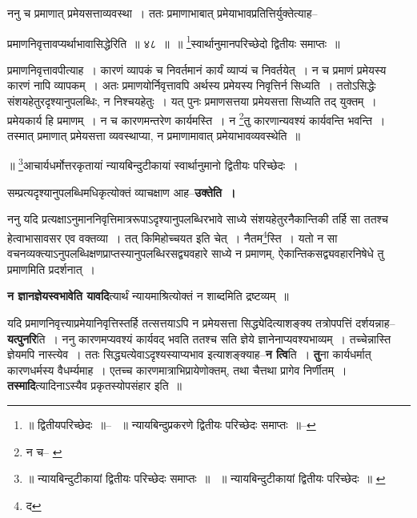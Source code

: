 \documentclass[article,12pt,a4paper]{memoir}
\begin{document}
	  \pstart ननु च प्रमाणात् प्रमेयसत्ताव्यवस्था । ततः प्रमाणाभाबात् प्रमेयाभावप्रतित्तिर्युक्तेत्याह--
	\pend
       
	  \bigskip
	  \begingroup
	

	  \pstart प्रमाणनिवृत्तावप्यर्थाभावासिद्धेरिति ॥ ४८ ॥ ॥ \footnote{॥ द्वितीयपरिच्छेदः ॥--\cite{dp-msD} \cite{dp-msB} ॥ न्यायबिन्दुप्रकरणे द्वितीयः परिच्छेदः समाप्तः ॥--\cite{dp-edE}}\-स्वार्थानुमानपरिच्छेदो द्वितीयः समाप्तः ॥
	\pend
      
	  \endgroup
	 

	  \pstart प्रमाणनिवृत्तावपीत्याह । कारणं व्यापकं च निवर्तमानं कार्यं व्याप्यं च निवर्तयेत् । न च प्रमाणं प्रमेयस्य कारणं नापि व्यापकम् । अतः प्रमाणयोर्निवृत्तावपि अर्थस्य प्रमेयस्य निवृत्तिर्न सिध्यति । ततोऽसिद्धेः संशयहेतुरदृश्यानुपलब्धिः, न निश्चयहेतुः । यत् पुनः प्रमाणसत्तया प्रमेयसत्ता सिध्यति तद् युक्तम् । प्रमेयकार्य हि प्रमाणम् । न च कारणमन्तरेण कार्यमस्ति । न \footnote{न च--\cite{dp-msB} \cite{dp-msD}}\-तु कारणान्यवश्यं कार्यवन्ति भवन्ति । तस्मात् प्रमाणात् प्रमेयसत्ता व्यवस्थाप्या, न प्रमाणामावात् प्रमेयाभावव्यवस्थेति ॥
	\pend
       

	  \pstart ॥ \footnote{॥ न्यायबिन्दुटीकायां द्वितीयः परिच्छेदः समाप्तः ॥ \cite{dp-msA} \cite{dp-msB} \cite{dp-edP} \cite{dp-edH} \cite{dp-edE} ॥ न्यायबिन्दुटीकायां द्वितीयः परिच्छेदः ॥ \cite{dp-msD}}\-आचार्यधर्मोत्तरकृतायां न्यायबिन्दुटीकायां स्वार्थानुमानो द्वितीयः परिच्छेदः ।
	\pend
      
	  \endgroup
	

	  \pstart सम्प्रत्यदृश्यानुपलब्धिमधिकृत्योक्तं व्याचक्षाण आह--\textbf{उक्तेति ।}
	\pend
      

	  \pstart ननु यदि प्रत्यक्षाऽनुमाननिवृत्तिमात्ररूपाऽदृश्यानुपलब्धिरभावे साध्ये संशयहेतुरनैकान्तिकी तर्हि सा ततश्च हेत्वाभासावसर एव वक्तव्या । तत् किमिहोच्चयत इति चेत् । नैतम\footnote{द}\-स्ति । यतो न सा वचनव्यक्त्याऽनुपलब्धिक्षणप्राप्तस्यानुपलब्धिरसद्व्यवहारे साध्ये न प्रमाणम्, ऐकान्तिकसद्व्यवहारनिषेधे तु प्रमाणमिति प्रदर्शनात् ।
	\pend
      

	  \pstart \textbf{न ज्ञानज्ञेयस्वभावेति यावदि}त्यार्थं न्यायमाश्रित्योक्तं न शाब्दमिति द्रष्टव्यम् ॥
	\pend
      

	  \pstart यदि प्रमाणनिवृत्त्या\leavevmode{}प्रमेयानिवृत्तिस्तर्हि तत्सत्तयाऽपि न प्रमेयसत्ता सिद्ध्येदित्याशङ्क्य तत्रोपपत्तिं दर्शयन्नाह--\textbf{यत्पुनरि}ति । ननु कारणमप्यवश्यं कार्यवद् भवति ततश्च सति ज्ञेये ज्ञानेनाप्यवश्यभाव्यम् । तच्चेन्नास्ति ज्ञेयमपि नास्त्येव । ततः सिद्ध्यत्येवाऽदृश्यस्याप्यभाव इत्याशङ्क्याह--\textbf{न त्वि}ति । \textbf{तु}ना कार्यधर्मात् कारणधर्मस्य वैधर्म्यमाह । एतच्च कारणमात्राभिप्रायेणोक्तम्, तथा चैत्तथा प्रागेव निर्णीतम् । \textbf{तस्मादि}त्यादिनाऽस्यैव प्रकृतस्योपसंहार इति ॥
	\pend
      
\end{document}
